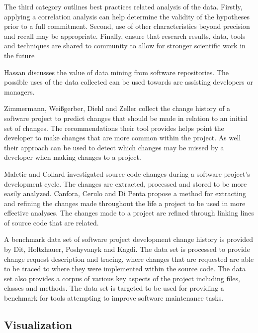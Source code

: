 The third category outlines best practices related analysis of the data. Firstly, applying a correlation analysis can help determine the validity of the hypotheses prior to a full commitment. Second, use of other characteristics beyond precision and recall may be appropriate. Finally, ensure that research results, data, tools and techniques are shared to community to allow for stronger scientific work in the future


Hassan discusses the value of data mining from software repositories. The possible uses of the data collected can be used towards are assisting developers or managers.

Zimmermann, Wei{\ss}gerber, Diehl and Zeller collect the change history of a software project to predict changes that should be made in relation to an initial set of changes\cite{Zimmermann2005a}. The recommendations their tool provides helps point the developer to make changes that are more common within the project. As well their approach can be used to detect which changes may be missed by a developer when making changes to a project.

Maletic and Collard investigated source code changes during a software project's development cycle\cite{Maletic2004}. The changes are extracted, processed and stored to be more easily analyzed. Canfora, Cerulo and Di Penta propose a method for extracting and refining the changes made throughout the life a project to be used in more effective analyses\cite{Canfora2007c}. The changes made to a project are refined through linking lines of source code that are related.

A benchmark data set of software project development change history is provided by Dit, Holtzhauer, Poshyvanyk and Kagdi\cite{Dit2013}. The data set is processed to provide change request description and tracing, where changes that are requested are able to be traced to where they were implemented within the source code. The data set also provides a corpus of various key aspects of the project including files, classes and methods. The data set is targeted to be used for providing a benchmark for tools attempting to improve software maintenance tasks.

\subsection{Visualization}

